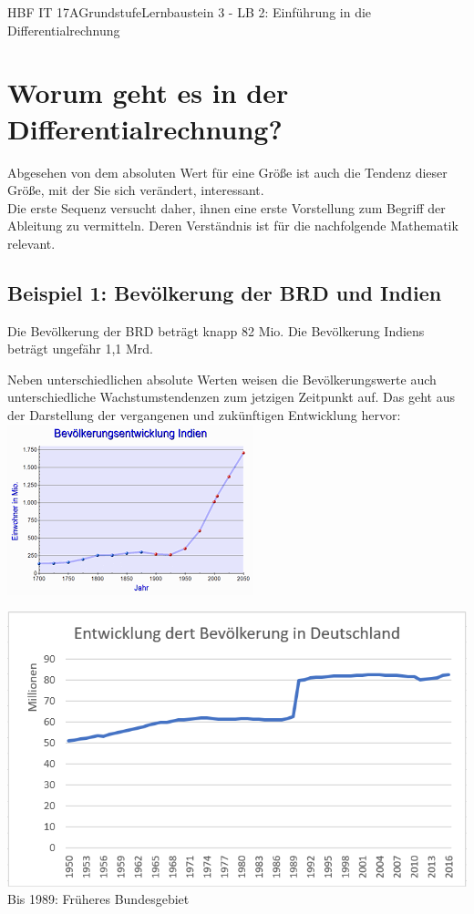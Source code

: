 \documentclass[11pt,twocolumn,oneside,openany,headings=optiontotoc,11pt,numbers=noenddot,final]{article}
\begin{document}
	\begin{worksheet}{HBF IT 17A}{Grundstufe}{Lernbaustein 3 - LB 2: Einführung in die Differentialrechnung}
		\section{Worum geht es in der Differentialrechnung?}
		Abgesehen von dem absoluten Wert für eine Größe ist auch die Tendenz dieser Größe, mit der Sie sich verändert, interessant.\\
		Die erste Sequenz versucht daher, ihnen eine erste Vorstellung zum Begriff der \glqq{}Ableitung\grqq{} zu vermitteln. Deren Verständnis ist für die nachfolgende Mathematik relevant.
		\subsection*{Beispiel 1: Bevölkerung der BRD und Indien}
		Die Bevölkerung der BRD beträgt knapp 82 Mio. Die Bevölkerung Indiens beträgt ungefähr 1,1 Mrd.\\
		\par
		Neben unterschiedlichen absolute Werten weisen die Bevölkerungswerte auch unterschiedliche Wachstumstendenzen zum jetzigen Zeitpunkt auf. Das geht aus der Darstellung der vergangenen und zukünftigen Entwicklung hervor:\\
		\includegraphics[scale=0.8]{Bilder/BevIndien.png}\\
		\par
		\noindent
		\includegraphics[scale=0.59]{Bilder/BevDeutschland.png}
		\tiny{Bis 1989: Früheres Bundesgebiet}
		\normalsize

\end{worksheet}
\end{document}
